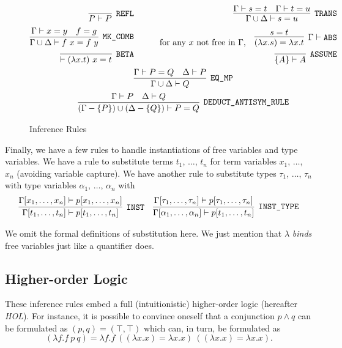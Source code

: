 \begin{figure}
  \begin{gather*}
    \begin{aligned}
      \infer[\code{REFL}]{P\vdash P}{} &\qquad&
      \infer[\code{TRANS}]{\Gamma\cup\Delta\vdash s=u}{\Gamma\vdash s=t&\Gamma\vdash t=u}\\
      \infer[\code{MK\_COMB}]{\Gamma\cup\Delta\vdash f\ x=f\ y}{\Gamma\vdash x = y & f = g} &&
      \text{for any $x$ not free in $\Gamma$,}\quad \infer[\Gamma \vdash \code{ABS}]{(\lambda x. s) = \lambda x. t}{s = t}\\
      \infer[\code{BETA}]{\vdash (\lambda x. t)\ x = t}{}&&
      \infer[\code{ASSUME}]{\{A\} \vdash A}{}
    \end{aligned}\\
    \infer[\code{EQ\_MP}]{\Gamma\cup\Delta\vdash Q}{\Gamma\vdash P = Q & \Delta\vdash P}\\
    \infer[\code{DEDUCT\_ANTISYM\_RULE}]{(\Gamma - \{P\})\cup(\Delta - \{Q\})\vdash P = Q}{\Gamma\vdash P & \Delta\vdash Q}\\
  \end{gather*}
  \caption{Inference Rules}
  \label{fig:HOLInferenceRules}
\end{figure}

Finally, we have a few rules to handle instantiations of free variables and type variables. We have a rule to substitute terms $t_1$, $\ldots$, $t_n$ for term variables $x_1$, $\ldots$, $x_n$ (avoiding variable capture). We have another rule to substitute types $\tau_1$, $\ldots$, $\tau_n$ with type variables $\alpha_1$, $\ldots$, $\alpha_n$ with 
\begin{align*}
  \infer[\code{INST}]{\Gamma[t_1,\ldots,t_n]
    \vdash p[t_1,\ldots,t_n]}
  {\Gamma[x_1,\ldots,x_n]\vdash p[x_1,\ldots,x_n]}&&
  \infer[\code{INST\_TYPE}]{\Gamma[\alpha_1,\ldots,\alpha_n]
    \vdash p[t_1,\ldots,t_n]}
  {\Gamma[\tau_1,\ldots,\tau_n]\vdash p[\tau_1,\ldots,\tau_n]}
\end{align*}

We omit the formal definitions of substitution here. We just mention that $\lambda$ \emph{binds} free variables just like a quantifier does.

\subsection{Higher-order Logic}
These inference rules embed a full (intuitionistic) higher-order logic (hereafter \emph{HOL}). For instance, it is possible to convince oneself that a conjunction $p \wedge q$ can be formulated as $(p,q) = (\top,\top)$ which can, in turn, be formulated as
\begin{displaymath}
(\lambda f. f\ p\ q) = \lambda f. f\ ((\lambda x. x) = \lambda x. x)\ ((\lambda x. x) = \lambda x. x).
\end{displaymath}

